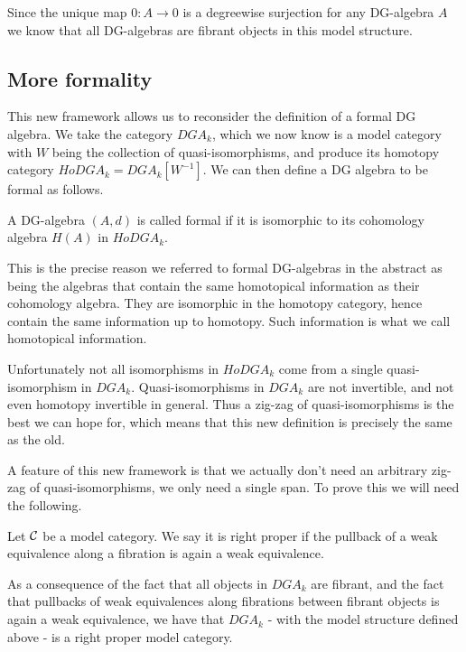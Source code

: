Since the unique map $0: A\longrightarrow 0$ is a degreewise surjection for any DG-algebra $A$ we know that all DG-algebras are fibrant objects in this model structure. 




\subsection{More formality}

This new framework allows us to reconsider the definition of a formal DG algebra. We take the category $DGA_k$, which we now know is a model category with $W$ being the collection of quasi-isomorphisms, and produce its homotopy category $HoDGA_k = DGA_k[W^{-1}]$. We can then define a DG algebra to be formal as follows. 

\begin{definition}
A DG-algebra $(A, d)$ is called formal if it is isomorphic to its cohomology algebra $H(A)$ in $HoDGA_k$.
\end{definition}

This is the precise reason we referred to formal DG-algebras in the abstract as being the algebras that contain the same homotopical information as their cohomology algebra. They are isomorphic in the homotopy category, hence contain the same information up to homotopy. Such information is what we call homotopical information. 

Unfortunately not all isomorphisms in $HoDGA_k$ come from a single quasi-isomorphism in $DGA_k$. Quasi-isomorphisms in $DGA_k$ are not invertible, and not even homotopy invertible in general. Thus a zig-zag of quasi-isomorphisms is the best we can hope for, which means that this new definition is precisely the same as the old. 

A feature of this new framework is that we actually don't need an arbitrary zig-zag of quasi-isomorphisms, we only need a single span. To prove this we will need the following. 

\begin{definition}
Let $\mathcal{C}$ be a model category. We say it is right proper if the pullback of a weak equivalence along a fibration is again a weak equivalence. 
\end{definition}

As a consequence of the fact that all objects in $DGA_k$ are fibrant, and the fact that pullbacks of weak equivalences along fibrations between fibrant objects is again a weak equivalence, we have that $DGA_k$ - with the model structure defined above - is a right proper model category.  

